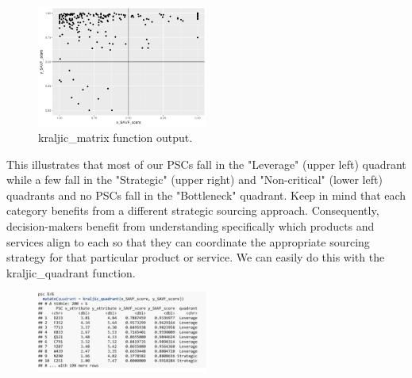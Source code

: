 \documentclass[twocolumn]{svjour3}       %
\begin{document}
\begin{figure}[!htb]
  \includegraphics[width=0.5\textwidth]{fig5.png}
  \caption{kraljic\_matrix function output.}
  \label{fig:5}
\end{figure}

This illustrates that most of our PSCs fall in the "Leverage" (upper left) quadrant while a few fall in the "Strategic" (upper right) and "Non-critical" (lower left) quadrants and no PSCs fall in the "Bottleneck" quadrant. Keep in mind that each category benefits from a different strategic sourcing approach. Consequently, decision-makers benefit from understanding specifically which products and services align to each so that they can coordinate the appropriate sourcing strategy for that particular product or service. We can easily do this with the kraljic\_quadrant function.
\begin{figure}[!htb]
  \includegraphics[width=0.5\textwidth]{code10.png}
\end{figure}
\end{document}
